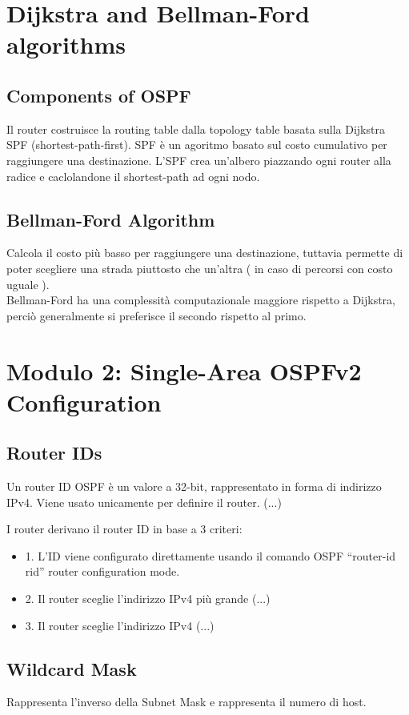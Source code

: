 \documentclass[12pt, a4paper]{article}
\begin{document}
	
	
	\section*{Dijkstra and Bellman-Ford algorithms}

	\subsection*{Components of OSPF}
	
	Il router costruisce la routing table dalla topology table basata sulla Dijkstra SPF (shortest-path-first). SPF è un agoritmo basato sul costo cumulativo per raggiungere una destinazione. L'SPF crea un'albero piazzando ogni router alla radice e caclolandone il shortest-path ad ogni nodo. 
	
	\subsection*{Bellman-Ford Algorithm}
	
	Calcola il costo più basso per raggiungere una destinazione, tuttavia permette di poter scegliere una strada piuttosto che un'altra ( in caso di percorsi con costo uguale ). \\ Bellman-Ford ha una complessità computazionale maggiore rispetto a Dijkstra, perciò generalmente si preferisce il secondo rispetto al primo.
	
	
	
	\section*{Modulo 2: Single-Area OSPFv2 Configuration}
	
	\subsection*{Router IDs}
	
	Un router ID OSPF è un valore a 32-bit, rappresentato in forma di indirizzo IPv4. Viene usato unicamente per definire il router. (...)
	
	I router derivano il router ID in base a 3 criteri:
	\begin{itemize}
		\item 1. L'ID viene configurato direttamente usando il comando OSPF ``router-id rid'' router configuration mode.
		\item 2. Il router sceglie l'indirizzo IPv4 più grande (...)
		\item 3. Il router sceglie l'indirizzo IPv4 (...)
	\end{itemize}
	
	\subsection*{Wildcard Mask}
	
	Rappresenta l'inverso della Subnet Mask e rappresenta il numero di host.
	
	
\end{document}
